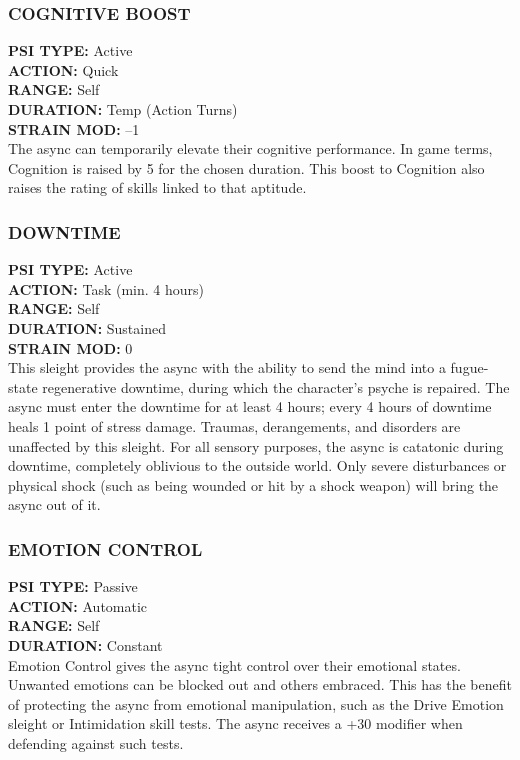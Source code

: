 \subsubsection{COGNITIVE BOOST}
\textbf{PSI TYPE:} Active \\ 
\textbf{ACTION:} Quick \\ 
\textbf{RANGE:} Self \\ 
\textbf{DURATION:} Temp (Action Turns) \\
\textbf{STRAIN MOD:} –1 \\
The async can temporarily elevate their cognitive
performance. In game terms, Cognition is raised by 5
for the chosen duration. This boost to Cognition also
raises the rating of skills linked to that aptitude.

\subsubsection{DOWNTIME}
\textbf{PSI TYPE:} Active \\ 
\textbf{ACTION:} Task (min. 4 hours) \\ 
\textbf{RANGE:} Self \\ 
\textbf{DURATION:} Sustained \\
\textbf{STRAIN MOD:} 0 \\
This sleight provides the async with the ability
to send the mind into a fugue-state regenerative
downtime, during which the character’s psyche is
repaired. The async must enter the downtime for
at least 4 hours; every 4 hours of downtime heals
1 point of stress damage. Traumas, derangements,
and disorders are unaffected by this sleight. For
all sensory purposes, the async is catatonic during
downtime, completely oblivious to the outside
world. Only severe disturbances or physical shock
(such as being wounded or hit by a shock weapon)
will bring the async out of it.

\subsubsection{EMOTION CONTROL}
\textbf{PSI TYPE:} Passive \\ 
\textbf{ACTION:} Automatic \\ 
\textbf{RANGE:} Self \\ 
\textbf{DURATION:} Constant \\
Emotion Control gives the async tight control
over their emotional states. Unwanted emotions
can be blocked out and others embraced. This has
the benefit of protecting the async from emotional
manipulation, such as the Drive Emotion sleight or
Intimidation skill tests. The async receives a +30
modifier when defending against such tests.

